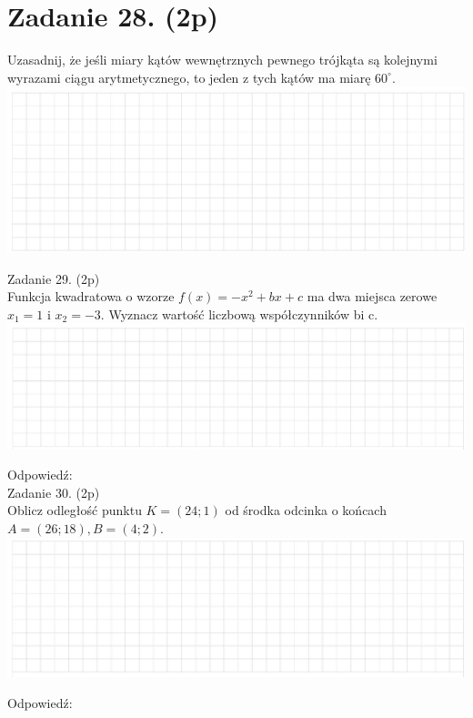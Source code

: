 \documentclass[10pt]{article}
\begin{document}
\section*{Zadanie 28. (2p)}
Uzasadnij, że jeśli miary kątów wewnętrznych pewnego trójkąta są kolejnymi wyrazami ciągu arytmetycznego, to jeden z tych kątów ma miarę \(60^{\circ}\).\\
\includegraphics[max width=\textwidth, center]{2024_11_21_19ede52d758866b0d67eg-09}

Zadanie 29. (2p)\\
Funkcja kwadratowa o wzorze \(f(x)=-x^{2}+b x+c\) ma dwa miejsca zerowe \(x_{1}=1\) i \(x_{2}=-3\). Wyznacz wartość liczbową współczynników bi c.\\
\includegraphics[max width=\textwidth, center]{2024_11_21_19ede52d758866b0d67eg-10}

Odpowiedź:\\
Zadanie 30. (2p)\\
Oblicz odległość punktu \(K=(24 ; 1)\) od środka odcinka o końcach \(A=(26 ; 18), B=(4 ; 2)\).\\
\includegraphics[max width=\textwidth, center]{2024_11_21_19ede52d758866b0d67eg-10(2)}

Odpowiedź:
\end{document}
